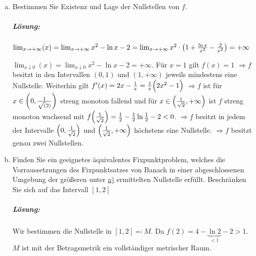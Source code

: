 \documentclass{scrreprt}
\begin{document}
\begin{enumerate}[a)]
\item Bestimmen Sie Existenz und Lage der Nullstellen von $f$.
  \label{sec:3_a}
  \subparagraph{Lösung:} $\lim_{x \to +\infty} (x) =
  \lim_{x \to +\infty} x^2 - \ln x  - 2
  = \lim_{x \to +\infty} x^2 \cdot \qty(1 + \frac{\ln x}{x ^ 2} - \frac{2}{x^2}) = +\infty$

  $\lim_{x \downarrow 0} (x) =
  \lim_{x \downarrow 0} x^2 - \ln x  - 2 = +\infty$.
  Für $x = 1$ gilt $f(x) = 1$
  $\Rightarrow f$ besitzt in den Intervallen $(0, 1)$ und $(1, +\infty)$
  jeweils mindestens eine Nullstelle.
  Weiterhin gilt $f'(x) = 2x - \frac{1}{x} = \frac{1}{x} \qty\Big(2 x^2  - 1)$
  $\Rightarrow f$ ist für $x \in \qty(0, \frac{1}{\sqrt(2)})$ streng monoton
  fallend und für $x \in \qty(\frac{1}{\sqrt{2}}, +\infty)$ ist $f$ streng
  monoton wachsend mit
  $f\qty(\frac{1}{\sqrt{2}}) = \frac{1}{2} - \frac{1}{2} \ln \frac{1}{2} - 2 < 0$.
  $\Rightarrow f$ besitzt in jedem der Intervalle
  $\qty(0, \frac{1}{\sqrt{2}})$ und $\qty(\frac{1}{\sqrt{2}}, +\infty)$
  höchstens eine Nullstelle.
  $\Rightarrow f$ besitzt genau zwei Nullstellen.

\item Finden Sie ein geeignetes äquivalentes Fixpunktproblem, welches
  die Vorraussetzungen des Fixpunktsatzes von Banach in einer abgeschlossenen
  Umgebung der größeren unter \hyperref[sec:3_a]{a)} ermittelten Nullstelle
  erfüllt.
  Beschränken Sie sich auf das Intervall $[1, 2]$

  \subparagraph{Lösung:} Wir bestimmen die Nullstelle in $[1, 2] \eqqcolon M$.
  \label{sec:3_b}
  Da $f(2) = 4 - \underset{< 1}{\underbrace{\ln 2}} - 2 > 1$.
  $M$ ist mit der Betragsmetrik ein vollständiger metrischer Raum.


\end{enumerate}
\end{document}
